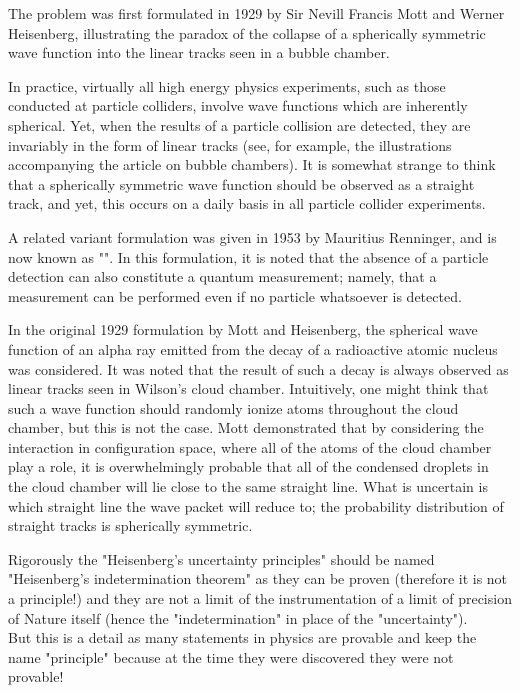 	The problem was first formulated in 1929 by Sir Nevill Francis Mott and Werner Heisenberg, illustrating the paradox of the collapse of a spherically symmetric wave function into the linear tracks seen in a bubble chamber.

	In practice, virtually all high energy physics experiments, such as those conducted at particle colliders, involve wave functions which are inherently spherical. Yet, when the results of a particle collision are detected, they are invariably in the form of linear tracks (see, for example, the illustrations accompanying the article on bubble chambers). It is somewhat strange to think that a spherically symmetric wave function should be observed as a straight track, and yet, this occurs on a daily basis in all particle collider experiments.

	A related variant formulation was given in 1953 by Mauritius Renninger, and is now known as "". In this formulation, it is noted that the absence of a particle detection can also constitute a quantum measurement; namely, that a measurement can be performed even if no particle whatsoever is detected.

	In the original 1929 formulation by Mott and Heisenberg, the spherical wave function of an alpha ray emitted from the decay of a radioactive atomic nucleus was considered. It was noted that the result of such a decay is always observed as linear tracks seen in Wilson's cloud chamber. Intuitively, one might think that such a wave function should randomly ionize atoms throughout the cloud chamber, but this is not the case. Mott demonstrated that by considering the interaction in configuration space, where all of the atoms of the cloud chamber play a role, it is overwhelmingly probable that all of the condensed droplets in the cloud chamber will lie close to the same straight line. What is uncertain is which straight line the wave packet will reduce to; the probability distribution of straight tracks is spherically symmetric. 
	\begin{tcolorbox}[title=Remark,colframe=black,arc=10pt]
	Rigorously the "Heisenberg's uncertainty principles" should be named "Heisenberg's indetermination theorem" as they can be proven (therefore it is not a principle!) and they are not a limit of the instrumentation of a limit of precision of Nature itself (hence the "indetermination" in place of the "uncertainty").\\
	
	But this is a detail as many statements in physics are provable  and keep the name "principle" because at the time they were discovered they were not provable!
	\end{tcolorbox}

